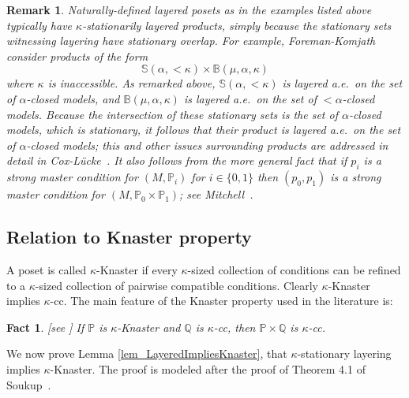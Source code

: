 \documentclass{amsart}
\newtheorem{fact}[theorem]{Fact}
\newtheorem{remark}[theorem]{Remark}
\begin{document}
\begin{remark}
Naturally-defined layered posets as in the examples listed above typically have $\kappa$-stationarily layered products, simply because the stationary sets witnessing layering have stationary overlap.  For example, Foreman-Komjath~\cite{MR2151585} consider products of the form
\begin{equation*}
\mathbb{S}(\alpha, < \kappa) \times \mathbb{B}(\mu, \alpha, \kappa)
\end{equation*}
where $\kappa$ is inaccessible.  As remarked above, $\mathbb{S}(\alpha, < \kappa)$ is layered a.e.\ on the set of $\alpha$-closed models, and $\mathbb{B}(\mu, \alpha, \kappa)$ is layered a.e.\ on the set of $<\alpha$-closed models.  Because the intersection of these stationary sets is the set of $\alpha$-closed models, which is stationary, it follows that their product is layered a.e.\ on the set of $\alpha$-closed models; this and other issues surrounding products are addressed in detail in Cox-L\"ucke~\cite{Cox_Luecke}.  It also follows from the more general fact that if $p_i$ is a strong master condition for $(M, \mathbb{P}_i)$ for $i \in \{ 0, 1 \}$ then $(p_0, p_1)$ is a strong master condition for $(M,  \mathbb{P}_0 \times \mathbb{P}_1)$; see Mitchell~\cite{MR2452816}.
\end{remark}



\subsection{Relation to Knaster property}\label{sec_RelationToKnaster}

A poset is called $\kappa$-Knaster if every $\kappa$-sized collection of conditions can be refined to a $\kappa$-sized collection of pairwise compatible conditions.  Clearly $\kappa$-Knaster implies $\kappa$-cc.  The main feature of the Knaster property used in the literature is:

\begin{fact}\label{fact_KnasterProduct}[see \cite{MR2768691}]
If $\mathbb{P}$ is $\kappa$-Knaster and $\mathbb{Q}$ is $\kappa$-cc, then $\mathbb{P} \times \mathbb{Q}$ is $\kappa$-cc.
\end{fact}

We now prove Lemma \ref{lem_LayeredImpliesKnaster}, that $\kappa$-stationary layering implies $\kappa$-Knaster.  The proof is modeled after the proof of Theorem 4.1 of Soukup~\cite{MR2800978}.
\end{document}
